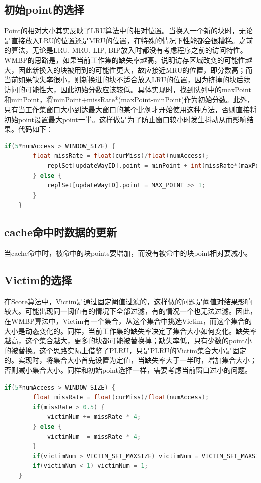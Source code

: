 \documentclass[utf8]{article}
\begin{document}
\subsection{初始point的选择}
Point的相对大小其实反映了LRU算法中的相对位置。当换入一个新的块时，无论是直接放入LRU的位置还是MRU的位置，在特殊的情况下性能都会很糟糕。之前的算法，无论是LRU, MRU, LIP, BIP放入时都没有考虑程序之前的访问特性。WMBP的思路是，如果当前工作集的缺失率越高，说明访存区域改变的可能性越大，因此新换入的块被用到的可能性更大，故应接近MRU的位置，即分数高；而当前如果缺失率很小，则新换进的块不适合放入LRU的位置，因为挤掉的块后续访问的可能性大，因此初始分数应该较低。具体实现时，找到队列中的maxPoint和minPoint，将minPoint+missRate*(maxPoint-minPoint)作为初始分数。此外，只有当工作集窗口大小到达最大窗口的某个比例才开始使用这种方法，否则直接将初始point设置最大point一半。这样做是为了防止窗口较小时发生抖动从而影响结果。代码如下：
\begin{lstlisting}[language=c++]
    if(5*numAccess > WINDOW_SIZE) {
        float missRate = float(curMiss)/float(numAccess);
            replSet[updateWayID].point = minPoint + int(missRate*(maxPoint-minPoint));
        } else {
            replSet[updateWayID].point = MAX_POINT >> 1;
        }
    }
\end{lstlisting}

\subsection{cache命中时数据的更新}
当cache命中时，被命中的块points要增加，而没有被命中的块point相对要减小。

\subsection{Victim的选择}
在Score算法中，Victim是通过固定阈值过滤的，这样做的问题是阈值对结果影响较大。可能出现同一阈值有的情况下全部过滤，有的情况一个也无法过滤。因此，在WMBP算法中，Victim有一个集合，从这个集合中挑选Victim，而这个集合的大小是动态变化的。同样，当前工作集的缺失率决定了集合大小如何变化。缺失率越高，这个集合越大，更多的块都可能被替换掉；缺失率低，只有少数的point小的被替换。这个思路实际上借鉴了PLRU，只是PLRU的Victim集合大小是固定的。实现时，将集合大小首先设置为定值，当缺失率大于一半时，增加集合大小；否则减小集合大小。同样和初始point选择一样，需要考虑当前窗口过小的问题。
\begin{lstlisting}[language=c++]
    if(5*numAccess > WINDOW_SIZE) {
        float missRate = float(curMiss)/float(numAccess);
        if(missRate > 0.5) {
            victimNum += missRate * 4;
        } else {
            victimNum -= missRate * 4;
        }
        if(victimNum > VICTIM_SET_MAXSIZE) victimNum = VICTIM_SET_MAXSIZE;
        if(victimNum < 1) victimNum = 1;
    }
\end{lstlisting}
\end{document}
